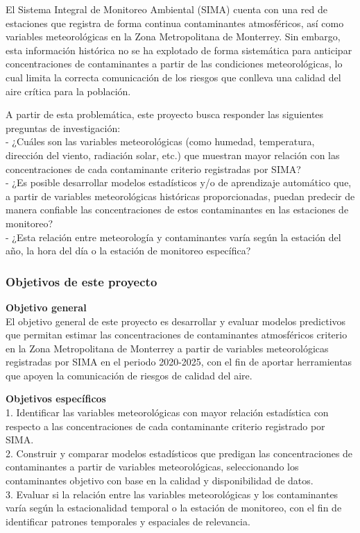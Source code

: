 \documentclass[
  letterpaper,
  DIV=11,
  numbers=noendperiod]{scrartcl}
\begin{document}
\hfill\break
El Sistema Integral de Monitoreo Ambiental (SIMA) cuenta con una red de
estaciones que registra de forma continua contaminantes atmosféricos,
así como variables meteorológicas en la Zona Metropolitana de Monterrey.
Sin embargo, esta información histórica no se ha explotado de forma
sistemática para anticipar concentraciones de contaminantes a partir de
las condiciones meteorológicas, lo cual limita la correcta comunicación
de los riesgos que conlleva una calidad del aire crítica para la
población.

A partir de esta problemática, este proyecto busca responder las
siguientes preguntas de investigación:\\
- ¿Cuáles son las variables meteorológicas (como humedad, temperatura,
dirección del viento, radiación solar, etc.) que muestran mayor relación
con las concentraciones de cada contaminante criterio registradas por
SIMA?\\
- ¿Es posible desarrollar modelos estadísticos y/o de aprendizaje
automático que, a partir de variables meteorológicas históricas
proporcionadas, puedan predecir de manera confiable las concentraciones
de estos contaminantes en las estaciones de monitoreo?\\
- ¿Esta relación entre meteorología y contaminantes varía según la
estación del año, la hora del día o la estación de monitoreo específica?

\subsubsection{Objetivos de este
proyecto}\label{objetivos-de-este-proyecto}

\textbf{Objetivo general}\\
El objetivo general de este proyecto es desarrollar y evaluar modelos
predictivos que permitan estimar las concentraciones de contaminantes
atmosféricos criterio en la Zona Metropolitana de Monterrey a partir de
variables meteorológicas registradas por SIMA en el periodo 2020-2025,
con el fin de aportar herramientas que apoyen la comunicación de riesgos
de calidad del aire.

\textbf{Objetivos específicos}\\
1. Identificar las variables meteorológicas con mayor relación
estadística con respecto a las concentraciones de cada contaminante
criterio registrado por SIMA.\\
2. Construir y comparar modelos estadísticos que predigan las
concentraciones de contaminantes a partir de variables meteorológicas,
seleccionando los contaminantes objetivo con base en la calidad y
disponibilidad de datos.\\
3. Evaluar si la relación entre las variables meteorológicas y los
contaminantes varía según la estacionalidad temporal o la estación de
monitoreo, con el fin de identificar patrones temporales y espaciales de
relevancia.
\end{document}
